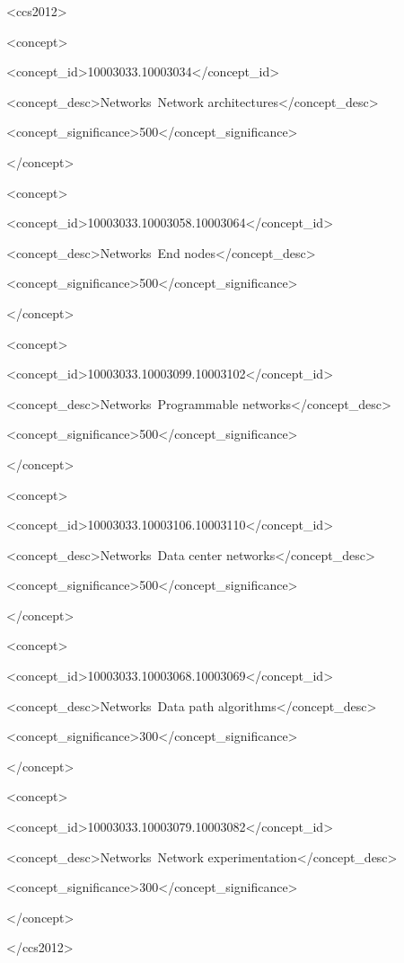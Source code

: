 \documentclass[10pt]{sig-alternate-05-2015}
\begin{document}
\begin{CCSXML}

<ccs2012>

<concept>

<concept_id>10003033.10003034</concept_id>

<concept_desc>Networks~Network architectures</concept_desc>

<concept_significance>500</concept_significance>

</concept>

<concept>

<concept_id>10003033.10003058.10003064</concept_id>

<concept_desc>Networks~End nodes</concept_desc>

<concept_significance>500</concept_significance>

</concept>

<concept>

<concept_id>10003033.10003099.10003102</concept_id>

<concept_desc>Networks~Programmable networks</concept_desc>

<concept_significance>500</concept_significance>

</concept>

<concept>

<concept_id>10003033.10003106.10003110</concept_id>

<concept_desc>Networks~Data center networks</concept_desc>

<concept_significance>500</concept_significance>

</concept>

<concept>

<concept_id>10003033.10003068.10003069</concept_id>

<concept_desc>Networks~Data path algorithms</concept_desc>

<concept_significance>300</concept_significance>

</concept>

<concept>

<concept_id>10003033.10003079.10003082</concept_id>

<concept_desc>Networks~Network experimentation</concept_desc>

<concept_significance>300</concept_significance>

</concept>

</ccs2012>

\end{CCSXML}
\end{document}
